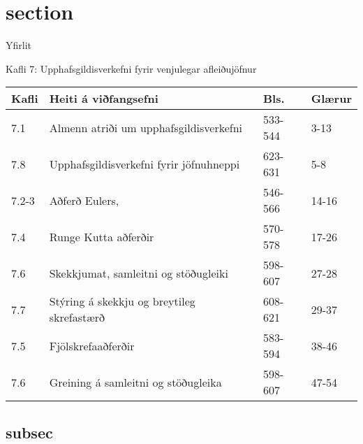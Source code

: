 \date{4., 6. og 11.~mars, 2015}



\section{section}
\begin{frame}
	\maketitle
\end{frame}

\begin{frame}{Yfirlit}
\begin{block}{Kafli 7: Upphafsgildisverkefni fyrir venjulegar afleiðujöfnur}
\begin{center}
\begin{tabular}{|l|l|l|l|}\hline
Kafli &Heiti á viðfangsefni & Bls. & Glærur \\
\hline
7.1 &Almenn atriði um upphafsgildisverkefni & 533-544 & 3-13\\
7.8 & Upphafsgildisverkefni fyrir jöfnuhneppi & 623-631 & 5-8\\
7.2-3 &Aðferð Eulers,  & 546-566 & 14-16\\
7.4 &Runge Kutta aðferðir & 570-578 & 17-26\\
7.6 &Skekkjumat, samleitni og stöðugleiki & 598-607 & 27-28\\
7.7 &Stýring á skekkju og breytileg skrefastærð & 608-621 & 29-37 \\
7.5 &Fjölskrefaaðferðir& 583-594 & 38-46\\
7.6 & Greining á samleitni og stöðugleika&  598-607 & 47-54 \\
\hline
\end{tabular}
\end{center}
\end{block}
\end{frame}
\subsection{subsec}


